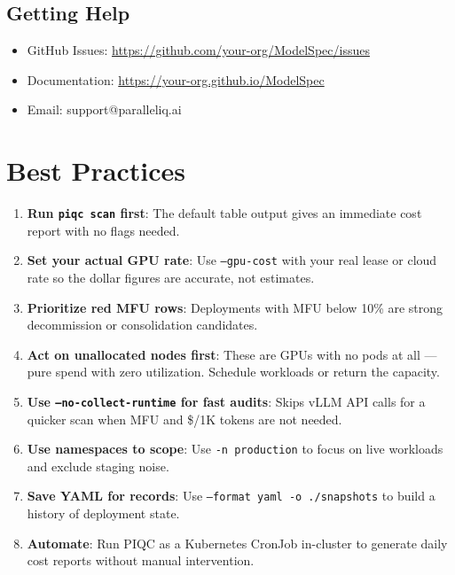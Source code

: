\documentclass[11pt,a4paper]{article}
\begin{document}
\subsection{Getting Help}

\begin{itemize}
    \item GitHub Issues: \url{https://github.com/your-org/ModelSpec/issues}
    \item Documentation: \url{https://your-org.github.io/ModelSpec}
    \item Email: support@paralleliq.ai
\end{itemize}

\section{Best Practices}

\begin{enumerate}
    \item \textbf{Run \texttt{piqc scan} first}: The default table output gives an immediate cost report with no flags needed.
    \item \textbf{Set your actual GPU rate}: Use \texttt{--gpu-cost} with your real lease or cloud rate so the dollar figures are accurate, not estimates.
    \item \textbf{Prioritize red MFU rows}: Deployments with MFU below 10\% are strong decommission or consolidation candidates.
    \item \textbf{Act on unallocated nodes first}: These are GPUs with no pods at all — pure spend with zero utilization. Schedule workloads or return the capacity.
    \item \textbf{Use \texttt{--no-collect-runtime} for fast audits}: Skips vLLM API calls for a quicker scan when MFU and \$/1K tokens are not needed.
    \item \textbf{Use namespaces to scope}: Use \texttt{-n production} to focus on live workloads and exclude staging noise.
    \item \textbf{Save YAML for records}: Use \texttt{--format yaml -o ./snapshots} to build a history of deployment state.
    \item \textbf{Automate}: Run PIQC as a Kubernetes CronJob in-cluster to generate daily cost reports without manual intervention.
\end{enumerate}
\end{document}
